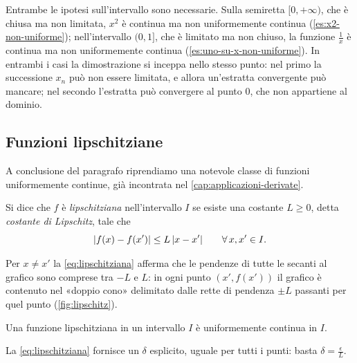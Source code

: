 Entrambe le ipotesi sull'intervallo sono necessarie. Sulla semiretta $[0,+\infty)$,
che è chiusa ma non limitata, $x^{2}$ è continua ma non uniformemente continua
(\cref{es:x2-non-uniforme}); nell'intervallo $(0,1]$, che è limitato ma non chiuso, la
funzione $\frac1x$ è continua ma non uniformemente continua
(\cref{es:uno-su-x-non-uniforme}). In entrambi i casi la dimostrazione si inceppa nello
stesso punto: nel primo la successione $x_{n}$ può non essere limitata, e allora
un'estratta convergente può mancare; nel secondo l'estratta può convergere al punto
$0$, che non appartiene al dominio.

\subsection{Funzioni lipschitziane}

A conclusione del paragrafo riprendiamo una notevole classe di funzioni uniformemente
continue, già incontrata nel \cref{cap:applicazioni-derivate}.

\begin{definizione}\label{def:lipschitziana}
Si dice che $f$ è \emph{lipschitziana} nell'intervallo $I$ se esiste una costante
$L\ge0$, detta \emph{costante di Lipschitz}, tale che
\begin{equation}\label{eq:lipschitziana}
  \lvert f(x)-f(x')\rvert\le L\,\lvert x-x'\rvert \qquad\forall\, x,x'\in I .
\end{equation}
\end{definizione}

Per $x\neq x'$ la \eqref{eq:lipschitziana} afferma che le pendenze di tutte le
secanti al grafico sono comprese tra $-L$ e $L$: in ogni punto $(x',f(x'))$ il grafico è
contenuto nel «doppio cono» delimitato dalle rette di pendenza $\pm L$ passanti per quel
punto (\cref{fig:lipschitz}).

\begin{proposizione}
\label{prop:lipschitz-uniforme}
Una funzione lipschitziana in un intervallo $I$ è uniformemente continua in $I$.
\end{proposizione}

\begin{schema}
\end{schema}

\begin{strategia}
La \eqref{eq:lipschitziana} fornisce un $\delta$ esplicito, uguale per tutti i punti:
basta $\delta=\frac\epsilon L$.
\end{strategia}

